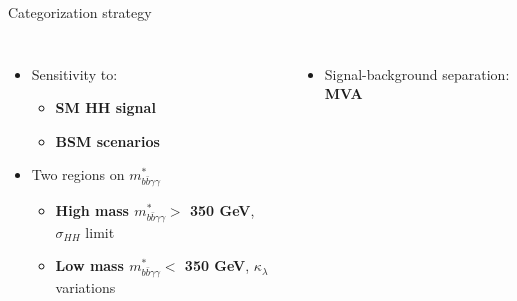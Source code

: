 \begin{frame}{Categorization strategy}

\begin{columns}
\begin{itemize}
    \item Sensitivity to:
    \begin{itemize}
        \item \textbf{\textcolor{HHred}{SM HH signal}}
        \item \textbf{\textcolor{HHturquoise_d}{
BSM scenarios}}
    \end{itemize}
\pause    
    \item Two regions on $m_{b \bar{b}\gamma\gamma}^{*}$
    \begin{itemize}
        \item \textbf{High mass $m_{b \bar{b}\gamma\gamma}^{*} >$ 350 GeV}, \textcolor{HHred}{$\sigma_{HH}$ limit}
        \item \textbf{Low mass $m_{b \bar{b}\gamma\gamma}^{*} <$ 350 GeV}, \textcolor{HHturquoise_d}{$\kappa_{\lambda}$ variations}
    \end{itemize}
\end{itemize}

\begin{itemize}
    \item Signal-background separation: \textbf{MVA}
\end{itemize}



\end{columns}
\end{frame}
